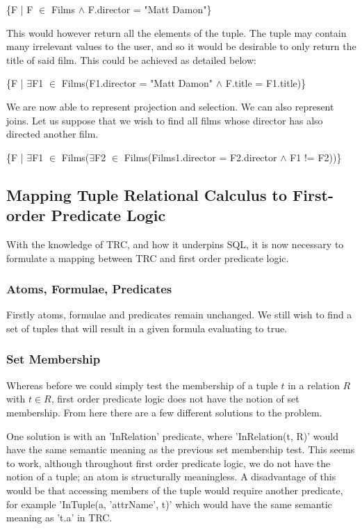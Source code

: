 \documentclass[a4paper, 11pt]{article}
\begin{document}
      \{F | F $\in$ Films $\land$ F.director = "Matt Damon"\}

      This would however return all the elements of the tuple. The tuple may
      contain many irrelevant values to the user, and so it would be desirable
      to only return the title of said film. This could be achieved as detailed
      below:

      \{F | $\exists$F1 $\in$ Films(F1.director = "Matt Damon" $\land$ F.title =
      F1.title)\}

      We are now able to represent projection and selection. We can also
      represent joins. Let us suppose that we wish to find all films whose
      director has also directed another film.

      \{F | $\exists$F1 $\in$ Films($\exists$F2 $\in$ Films(Films1.director =
      F2.director $\land$ F1 != F2))\}

  \subsection{Mapping Tuple Relational Calculus to First-order Predicate Logic}
    With the knowledge of TRC, and how it underpins SQL, it is now necessary to
    formulate a mapping between TRC and first order predicate logic.

    \subsubsection{Atoms, Formulae, Predicates}
      Firstly atoms, formulae and predicates remain unchanged. We still wish to
      find a set of tuples that will result in a given formula evaluating to
      true.

    \subsubsection{Set Membership}
      Whereas before we could simply test the membership of a tuple $t$ in a
      relation $R$ with $t \in R$, first order predicate logic does not have
      the notion of set membership. From here there are a few different
      solutions to the problem.

      One solution is with an 'InRelation' predicate, where 'InRelation(t, R)'
      would have the same semantic meaning as the previous set membership test.
      This seems to work, although throughout first order predicate logic, we
      do not have the notion of a tuple; an atom is structurally meaningless. A
      disadvantage of this would be that accessing members of the tuple would
      require another predicate, for example 'InTuple(a, 'attrName', t)' which
      would have the same semantic meaning as 't.a' in TRC.
\end{document}
